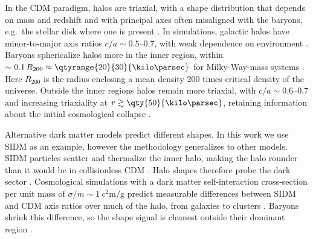 \documentclass[linenumbers,twocolumn]{aastex701}
\begin{document}
    In the \gls{CDM} paradigm, halos are triaxial, with a shape distribution that depends on mass and redshift and with principal axes often misaligned with the baryons, e.g.\ the stellar disk where one is present \citep{Bailin+Steinmetz:2005:InternalExternalAlignment,Vera-Ciro+:2011:ShapeDarkMatter,Baptista+:2022:OrientationsDMHalos}. %
    In simulations, galactic halos have minor-to-major axis ratios $c/a \sim \numrange{0.5}{0.7}$, with weak dependence on environment \citep{Jing+Suto:2002:TriaxialModelingHalo,Allgood+:2006:ShapeDarkMatter,Giocoli+:2026:AIDATNGProject3D}. %
    Baryons sphericalize halos more in the inner region, within $\sim 0.1\,R_{200} \approx \qtyrange{20}{30}{\kilo\parsec}$ for Milky-Way-mass systems \citep{Chua+:2019:ShapeDarkMatter,Prada+:2019:DarkMatterHalo,Chua+:2022:ImpactGalacticFeedback,Petit+:2023:ShapeAlignmentMass,Vargya+:2022:ShapesMilkyWayMassGalaxies}. %
    Here $R_{200}$ is the radius enclosing a mean density \num{200} times critical density of the universe. %
    Outside the inner regions halos remain more triaxial, with $c/a \sim \numrange{0.6}{0.7}$ and increasing triaxiality at $r \gtrsim \qty{50}{\kilo\parsec}$, retaining information about the initial cosmological collapse \citep{Kazantzidis+:2004:EffectGasCooling,Kazantzidis+:2010:SphericalizationDarkMatter}. %

    Alternative dark matter models predict different shapes. %
    In this work we use \Gls{SIDM} as an example, however the methodology generalizes to other models. %
    \Gls{SIDM} particles scatter and thermalize the inner halo, making the halo rounder than it would be in collisionless \gls{CDM} \citep{Dave+:2001:HaloPropertiesCosmological,Peter+:2013:CosmologicalSimulationsSelfInteracting,Kaplinghat+:2014:TyingDarkMatter}. %
    Halo shapes therefore probe the dark sector \citep[for reviews see][]{Tulin+Yu:2018:DarkMatterSelfinteractions,Adhikari+:2025:AstrophysicalTestsDark}. %
    Cosmological simulations with a dark matter self-interaction cross-section per unit mass of $\sigma/m \sim \qty{1}{\square\centi\meter\per\gram}$ predict measurable differences between \gls{SIDM} and \gls{CDM} axis ratios over much of the halo, from galaxies to clusters \citep{Vargya+:2022:ShapesMilkyWayMassGalaxies,Fischer+:2024:CosmologicalIdealizedSimulations,Brinckmann+:2018:StructureAssemblyHistory}. %
    Baryons shrink this difference, so the shape signal is cleanest outside their dominant region \citep{Despali+:2022:ConstrainingSIDMHalo}. %
\end{document}
